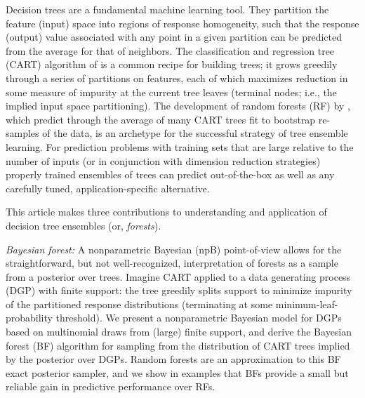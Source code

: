 \documentclass{article}
\begin{document}
Decision trees are a fundamental machine learning tool. They partition the
feature (input) space into regions of response homogeneity, such that the
response (output) value associated with any point in a given partition can be
predicted from the average for that of neighbors. The classification and
regression tree (CART) algorithm of \cite{breiman_classification_1984} is a
common recipe for building trees; it grows greedily through a series of
partitions on features, each of which maximizes reduction in some measure of
impurity at the current tree leaves (terminal nodes; i.e., the implied input
space partitioning). The development of random forests (RF) by
\cite{breiman_random_2001}, which predict through the average of many CART
trees fit to bootstrap re-samples of the data, is an archetype for the
successful strategy of tree ensemble learning. For prediction problems with
training sets that are large relative to the number of inputs (or in
conjunction with dimension reduction strategies) properly trained ensembles of
trees can predict out-of-the-box as well as any carefully tuned,
application-specific alternative.

This article makes three contributions to understanding and application of
decision tree ensembles (or, \textit{forests}).


\textit{Bayesian forest:}  A nonparametric Bayesian (npB) point-of-view
allows for the straightforward, but not well-recognized, interpretation of
forests as a sample from a posterior over trees. Imagine CART applied to a
data generating process (DGP) with finite support: the tree greedily splits
support to minimize impurity of the partitioned response distributions
(terminating at some minimum-leaf-probability threshold). We present a
nonparametric Bayesian model for DGPs based on multinomial draws from
(large) finite support, and derive the Bayesian forest (BF) algorithm for
sampling from the distribution of CART trees implied by the posterior over
DGPs.  Random forests are an approximation to this BF exact posterior sampler,
and we show in examples that BFs provide a small but reliable gain in
predictive performance over RFs.
\end{document}
